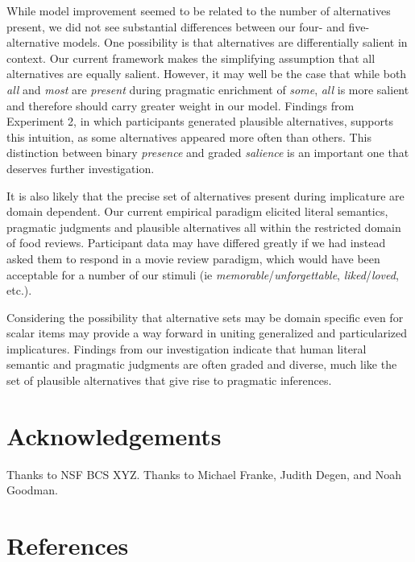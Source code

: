 \documentclass[10pt, letterpaper]{article}
\begin{document}
While model improvement seemed to be related to the number of
alternatives present, we did not see substantial differences between our
four- and five-alternative models. One possibility is that alternatives
are differentially salient in context. Our current framework makes the
simplifying assumption that all alternatives are equally salient.
However, it may well be the case that while both \emph{all} and
\emph{most} are \emph{present} during pragmatic enrichment of
\emph{some}, \emph{all} is more salient and therefore should carry
greater weight in our model. Findings from Experiment 2, in which
participants generated plausible alternatives, supports this intuition,
as some alternatives appeared more often than others. This distinction
between binary \emph{presence} and graded \emph{salience} is an
important one that deserves further investigation.

It is also likely that the precise set of alternatives present during
implicature are domain dependent. Our current empirical paradigm
elicited literal semantics, pragmatic judgments and plausible
alternatives all within the restricted domain of food reviews.
Participant data may have differed greatly if we had instead asked them
to respond in a movie review paradigm, which would have been acceptable
for a number of our stimuli (ie \emph{memorable}/\emph{unforgettable},
\emph{liked}/\emph{loved}, etc.).

Considering the possibility that alternative sets may be domain specific
even for scalar items may provide a way forward in uniting generalized
and particularized implicatures. Findings from our investigation
indicate that human literal semantic and pragmatic judgments are often
graded and diverse, much like the set of plausible alternatives that
give rise to pragmatic inferences.

\section{Acknowledgements}\label{acknowledgements}

Thanks to NSF BCS XYZ. Thanks to Michael Franke, Judith Degen, and Noah
Goodman.

\section{References}\label{references}

\setlength{\parindent}{-0.1in} \setlength{\leftskip}{0.125in} \noindent
\end{document}

